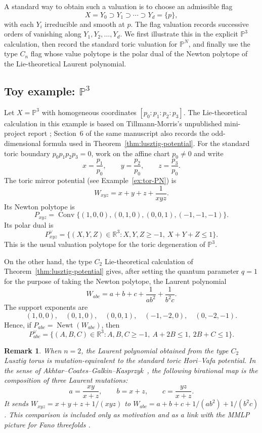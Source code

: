 \documentclass{article}
\newtheorem{rmk}[thm]{Remark}
\newcommand{\RR}{\mathbb{R}}
\newcommand{\PP}{\mathbb{P}}
\begin{document}
A standard way to obtain such a valuation is to choose an admissible flag
\[
X=Y_0\supset Y_1\supset\cdots\supset Y_d=\{p\},
\]
with each \(Y_i\) irreducible and smooth at \(p\). The flag valuation records successive orders of vanishing along \(Y_1,Y_2,\ldots,Y_d\). We first illustrate this in the explicit \(\PP^3\) calculation, then record the standard toric valuation for \(\PP^N\), and finally use the type \(C_n\) flag whose value polytope is the polar dual of the Newton polytope of the Lie-theoretical Laurent polynomial.

\subsection{Toy example: \(\PP^3\)}
Let \(X=\PP^3\) with homogeneous coordinates \([p_0:p_1:p_2:p_3]\). The Lie-theoretical calculation in this example is based on Tillmann-Morris's unpublished mini-project report \cite{TillmannMorris}; Section~6 of the same manuscript also records the odd-dimensional formula used in Theorem~\ref{thm:lusztig-potential}. For the standard toric boundary \(p_0p_1p_2p_3=0\), work on the affine chart \(p_0\ne0\) and write
\[
x=\frac{p_1}{p_0},
\qquad
y=\frac{p_2}{p_0},
\qquad
z=\frac{p_3}{p_0}.
\]
The toric mirror potential (see Example~\ref{ex:tor-PN}) is
\[
W_{xyz}=x+y+z+\frac{1}{xyz}.
\]
Its Newton polytope is
\[
P_{xyz}
=
\operatorname{Conv}\{(1,0,0),(0,1,0),(0,0,1),(-1,-1,-1)\}.
\]
Its polar dual is
\[
P_{xyz}^\vee
=
\{(X,Y,Z)\in\RR^3:
X,Y,Z\ge -1,\ X+Y+Z\le1\}.
\]
This is the usual valuation polytope for the toric degeneration of \(\PP^3\).

On the other hand, the type \(C_2\) Lie-theoretical calculation of Theorem~\ref{thm:lusztig-potential} gives, after setting the quantum parameter \(q=1\) for the purpose of taking the Newton polytope, the Laurent polynomial
\[
W_{abc}
=
a+b+c+\frac{1}{ab^2}+\frac{1}{b^2c}.
\]
The support exponents are
\[
(1,0,0),\quad (0,1,0),\quad (0,0,1),
\quad (-1,-2,0),\quad (0,-2,-1).
\]
Hence, if \(P_{abc}=\operatorname{Newt}(W_{abc})\), then
\[
P_{abc}^\vee
=
\{(A,B,C)\in\RR^3:
A,B,C\ge -1,\ A+2B\le1,\ 2B+C\le1\}.
\]

\begin{rmk}
When \(n=2\), the Laurent polynomial obtained from the type \(C_2\) Lusztig torus is mutation-equivalent to the standard toric Hori--Vafa potential. In the sense of Akhtar--Coates--Galkin--Kasprzyk~\cite{ACGK}, the following birational map is the composition of three Laurent mutations:
\[
a=\frac{xy}{x+z},\qquad
b=x+z,\qquad
c=\frac{yz}{x+z}.
\]
It sends \(W_{xyz}=x+y+z+1/(xyz)\) to \(W_{abc}=a+b+c+1/(ab^2)+1/(b^2c)\). This comparison is included only as motivation and as a link with the MMLP picture for Fano threefolds \cite{CKPT}.
\end{rmk}
\end{document}
